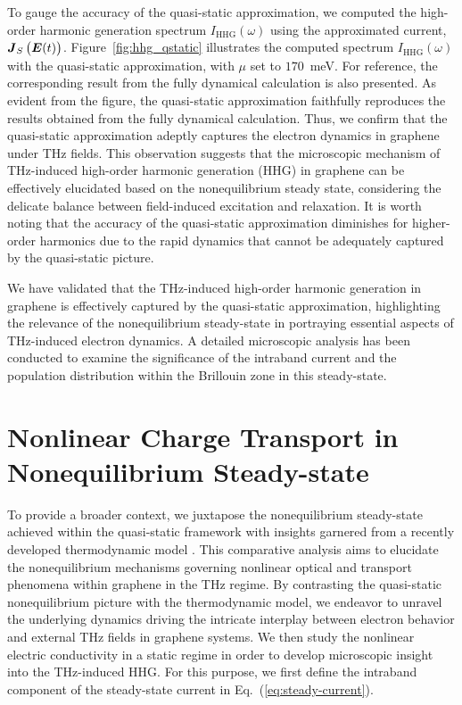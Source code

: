 To gauge the accuracy of the quasi-static approximation, we computed the high-order harmonic
generation spectrum $I_{\mathrm{HHG}}(\omega)$ using the approximated current, $\boldsymbol J_S\left(
\boldsymbol E(t) \right)$. Figure~\ref{fig:hhg_qstatic} illustrates the computed spectrum $I_{\mathrm{HHG}}(\omega)$ with the quasi-static approximation, with $\mu$ set to $170$~meV. For reference, the corresponding result from the fully dynamical calculation is also presented. As evident from the figure, the quasi-static approximation faithfully reproduces the results obtained from the fully dynamical calculation. Thus, we confirm that the quasi-static approximation adeptly captures the electron dynamics in graphene under THz fields. This observation suggests that the microscopic mechanism of THz-induced high-order harmonic generation (HHG) in graphene can be effectively elucidated based on the nonequilibrium steady state, considering the delicate balance between field-induced excitation and relaxation. It is worth noting that the accuracy of the quasi-static approximation diminishes for higher-order harmonics due to the rapid dynamics that cannot be adequately captured by the quasi-static picture.

We have validated that the THz-induced high-order harmonic generation in graphene is effectively captured by the quasi-static approximation, highlighting the relevance of the nonequilibrium steady-state in portraying essential aspects of THz-induced electron dynamics. A detailed microscopic analysis has been conducted to examine the significance of the intraband current and the population distribution within the Brillouin zone in this steady-state.
\section{Nonlinear Charge Transport in Nonequilibrium Steady-state}
To provide a broader context, we juxtapose the nonequilibrium steady-state achieved within the quasi-static framework with insights garnered from a recently developed thermodynamic model \cite{mics2015thermodynamic}. This comparative analysis aims to elucidate the nonequilibrium mechanisms governing nonlinear optical and transport phenomena within graphene in the THz regime. By contrasting the quasi-static nonequilibrium picture with the thermodynamic model, we endeavor to unravel the underlying dynamics driving the intricate interplay between electron behavior and external THz fields in graphene systems.
We then study the nonlinear electric conductivity in a static regime in order to develop
microscopic insight into the THz-induced HHG. For this purpose, we first define the intraband
component of the steady-state current in Eq.~(\ref{eq:steady-current}).


